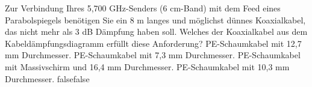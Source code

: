     {Zur Verbindung Ihres 5,700 GHz-Senders (6 cm-Band) mit dem Feed eines Parabolspiegels benötigen Sie ein 8 m langes und möglichst dünnes Koaxialkabel, das nicht mehr als 3 dB Dämpfung haben soll. Welches der Koaxialkabel aus dem Kabeldämpfungsdiagramm erfüllt diese Anforderung?}
    {PE-Schaumkabel mit 12,7 mm Durchmesser.}
    {PE-Schaumkabel mit 7,3 mm Durchmesser.}
    {PE-Schaumkabel mit Massivschirm und 16,4 mm Durchmesser.}
    {PE-Schaumkabel mit 10,3 mm Durchmesser.}
    {false}{false}
